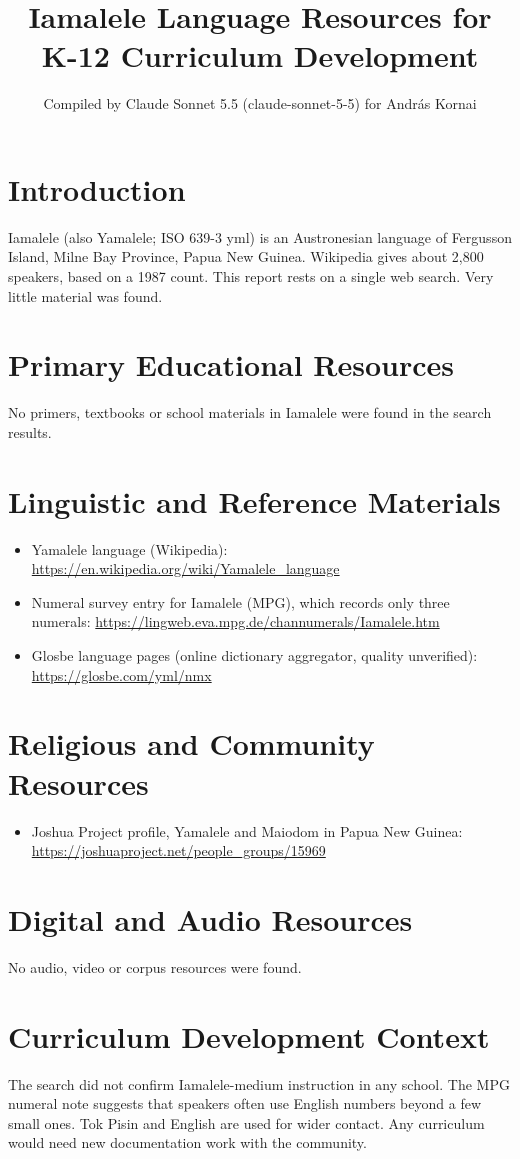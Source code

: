 \documentclass[12pt]{article}
\title{Iamalele Language Resources for K-12 Curriculum Development}
\author{Compiled by Claude Sonnet 5.5 (claude-sonnet-5-5) for Andr\'as Kornai}
\date{}
\begin{document}
\maketitle

\section{Introduction}
Iamalele (also Yamalele; ISO 639-3 yml) is an Austronesian language of Fergusson Island, Milne Bay Province, Papua New Guinea. Wikipedia gives about 2,800 speakers, based on a 1987 count. This report rests on a single web search. Very little material was found.

\section{Primary Educational Resources}
No primers, textbooks or school materials in Iamalele were found in the search results.

\section{Linguistic and Reference Materials}
\begin{itemize}
\item Yamalele language (Wikipedia): \url{https://en.wikipedia.org/wiki/Yamalele_language}
\item Numeral survey entry for Iamalele (MPG), which records only three numerals: \url{https://lingweb.eva.mpg.de/channumerals/Iamalele.htm}
\item Glosbe language pages (online dictionary aggregator, quality unverified): \url{https://glosbe.com/yml/nmx}
\end{itemize}

\section{Religious and Community Resources}
\begin{itemize}
\item Joshua Project profile, Yamalele and Maiodom in Papua New Guinea: \url{https://joshuaproject.net/people_groups/15969}
\end{itemize}

\section{Digital and Audio Resources}
No audio, video or corpus resources were found.

\section{Curriculum Development Context}
The search did not confirm Iamalele-medium instruction in any school. The MPG numeral note suggests that speakers often use English numbers beyond a few small ones. Tok Pisin and English are used for wider contact. Any curriculum would need new documentation work with the community.
\end{document}
